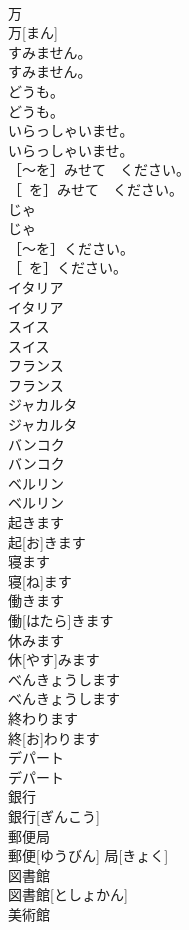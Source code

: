 \documentclass[8pt]{extreport}
\begin{document}
\begin{CJK}{UTF8}{min}
\\	万	
\\	万[まん]	
\\	すみません。	
\\	すみません。	
\\	どうも。	
\\	どうも。	
\\	いらっしゃいませ。	
\\	いらっしゃいませ。	
\\	［～を］みせて　ください。	
\\	［~を］みせて　ください。	
\\	じゃ	
\\	じゃ	
\\	［～を］ください。	
\\	［~を］ください。	
\\	イタリア	
\\	イタリア	
\\	スイス	
\\	スイス	
\\	フランス	
\\	フランス	
\\	ジャカルタ	
\\	ジャカルタ	
\\	バンコク	
\\	バンコク	
\\	ベルリン	
\\	ベルリン	
\\	起きます	
\\	起[お]きます	
\\	寝ます	
\\	寝[ね]ます	
\\	働きます	
\\	働[はたら]きます	
\\	休みます	
\\	休[やす]みます	
\\	べんきょうします	
\\	べんきょうします	
\\	終わります	
\\	終[お]わります	
\\	デパート	
\\	デパート	
\\	銀行	
\\	銀行[ぎんこう]	
\\	郵便局	
\\	郵便[ゆうびん] 局[きょく]	
\\	図書館	
\\	図書館[としょかん]	
\\	美術館	

\end{CJK}
\end{document}
